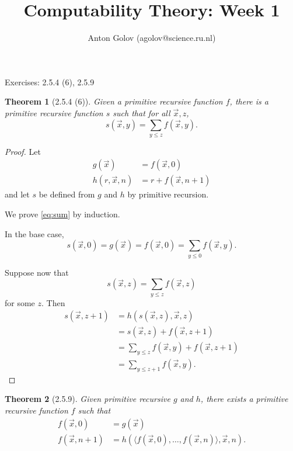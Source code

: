 \documentclass{article}
\title{Computability Theory: Week 1}
\author{Anton Golov (agolov@science.ru.nl)}
\newtheorem{theorem}{Theorem}
\newcommand{\tuple}[1]{\langle #1 \rangle}
\begin{document}
  \maketitle

  Exercises: 2.5.4 (6), 2.5.9

  \begin{theorem}[2.5.4 (6)]
    Given a primitive recursive function $f$, there is a primitive recursive
    function $s$ such that for all $\vec x, z$,
    \begin{equation}
      \label{eq:sum}
      s(\vec x, y) = \sum_{y \le z} f(\vec x, y).
    \end{equation}
  \end{theorem}

  \begin{proof}
    Let
    \begin{align*}
      g(\vec x) &= f(\vec x, 0)\\
      h(r, \vec x, n) &= r + f(\vec x, n+1)
    \end{align*}
    and let $s$ be defined from $g$ and $h$ by primitive recursion.

    We prove \ref{eq:sum} by induction.

    In the base case,
    \[
      s(\vec x, 0) = g(\vec x) = f(\vec x, 0) = \sum_{y \le 0} f(\vec x, y).
    \]

    Suppose now that
    \[
      s(\vec x, z) = \sum_{y \le z} f(\vec x, z)
    \]
    for some $z$.  Then
    \begin{align*}
      s(\vec x, z+1) &= h(s(\vec x, z), \vec x, z)\\
      &= s(\vec x, z) + f(\vec x, z+1)\\
      &= \sum_{y \le z} f(\vec x, y) + f(\vec x, z+1)\\
      &= \sum_{y \le z+1} f(\vec x, y).
    \end{align*}
  \end{proof}

  \begin{theorem}[2.5.9]
    Given primitive recursive $g$ and $h$, there exists a primitive recursive
    function $f$ such that
    \begin{align*}
      f(\vec x, 0) &= g(\vec x)\\
      f(\vec x, n+1) &= h(\tuple{f(\vec x, 0), \ldots, f(\vec x, n)}, \vec x, n).
    \end{align*}
  \end{theorem}
\end{document}
